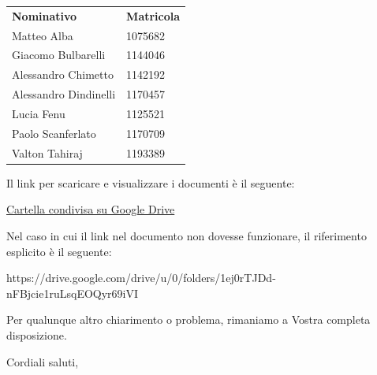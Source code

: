 \documentclass[12pt]{letter}
\begin{document}
\begin{letter}{ }
\begin{center}
   \centering
   \begin{tabular}{ll}
     \textbf{Nominativo}        & \textbf{Matricola} \\
     Matteo Alba                     &  1075682 \\
	 Giacomo Bulbarelli              &  1144046 \\
	 Alessandro Chimetto             &  1142192 \\     
	 Alessandro Dindinelli           &  1170457 \\	     
	 Lucia Fenu                      &  1125521 \\
     Paolo Scanferlato               &  1170709 \\
     Valton Tahiraj                  &  1193389 \\
   \end{tabular}
 \end{center}

Il link per scaricare e visualizzare i documenti è il seguente:

\begin{center}
\href{https://drive.google.com/drive/u/0/folders/1ej0rTJDd-nFBjcie1ruLsqEOQyr69iVI}{Cartella condivisa su Google Drive}
\end{center}

Nel caso in cui il link nel documento non dovesse funzionare, il riferimento esplicito è il seguente:
\begin{center}
https://drive.google.com/drive/u/0/folders/1ej0rTJDd-nFBjcie1ruLsqEOQyr69iVI
\end{center}


Per qualunque altro chiarimento o problema, rimaniamo a Vostra completa disposizione.

\closing{Cordiali saluti,}


\vspace{3em}

\end{letter}
\end{document}
